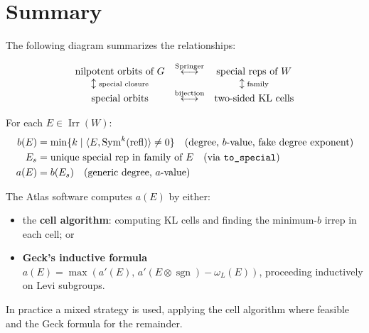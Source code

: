\documentclass[12pt]{amsart}
\newcommand{\Sym}{\operatorname{Sym}}
\newcommand{\sgn}{\operatorname{sgn}}
\newcommand{\refl}{\operatorname{refl}}
\newcommand{\Irr}{\operatorname{Irr}}
\begin{document}
\section{Summary}

The following diagram summarizes the relationships:

\[
\begin{array}{ccc}
  \text{nilpotent orbits of } G & \overset{\text{Springer}}{\longleftrightarrow} &
  \text{special reps of } W \\
  \updownarrow\text{\scriptsize special closure} & & \updownarrow\text{\scriptsize family} \\
  \text{special orbits} & \overset{\text{bijection}}{\longleftrightarrow} &
  \text{two-sided KL cells}
\end{array}
\]

For each $E \in \Irr(W)$:
\begin{align*}
  b(E) &= \min\{k \mid \langle E, \Sym^k(\refl)\rangle \neq 0\} \quad
           \text{(degree, } b\text{-value, fake degree exponent)} \\
  E_s  &= \text{unique special rep in family of } E
           \quad \text{(via \texttt{to\_special})} \\
  a(E) &= b(E_s) \quad \text{(generic degree, } a\text{-value)}
\end{align*}

The Atlas software computes $a(E)$ by either:
\begin{itemize}
  \item the \textbf{cell algorithm}: computing KL cells and finding the minimum-$b$
        irrep in each cell; or
  \item \textbf{Geck's inductive formula}
        $a(E) = \max(a'(E),\, a'(E \otimes \sgn) - \omega_L(E))$,
        proceeding inductively on Levi subgroups.
\end{itemize}
In practice a mixed strategy is used, applying the cell algorithm where
feasible and the Geck formula for the remainder.
\end{document}
